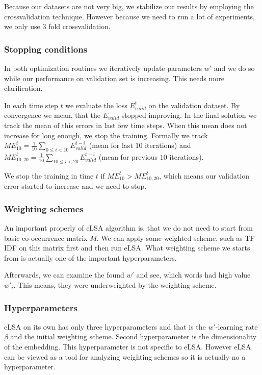     Because our datasets are not very big, we stabilize our results by employing the crossvalidation technique.  
    However because we need to run a lot of experiments, we only use $3$ fold crossvalidation.
    
    \subsubsection{Stopping conditions} \label{sec:elsa:stopping}
    
    In both optimization routines we iteratively update parameters $w'$ and we do so while our performance on validation set is increasing.
    This needs more clarification.
    
    In each time step $t$ we evaluate the loss $E_{valid}^t$ on the validation dataset.
    By convergence we mean, that the $E_{valid}$ stopped improving.
    In the final solution we track the mean of this errors in last few time steps.
    When this mean does not increase for long enough, we stop the training. 
    Formally we track 
    $ME_{10}^t = \frac{1}{10} \sum_{0\leq i < 10} E_{valid}^{t-i}$ (mean for last $10$ iterations) and
    $ME_{10,20}^t = \frac{1}{10} \sum_{10\leq i < 20} E_{valid}^{t-i}$ (mean for previous $10$ iterations).
    
    We stop the training in time $t$ if $ME_{10}^t > ME_{10,20}^t$, which means our validation error started to increase and we need to stop.
    
    \subsubsection{Weighting schemes}
    
    An important properly of eLSA algorithm is, that we do not need to start from basic co-occurrence matrix $M$. 
    We can apply some weighted scheme, such as TF-IDF on this matrix first and then run eLSA.
    What weighting scheme we starts from is actually one of the important hyperparameters.
    
    Afterwards, we can examine the found $w'$ and see, which words had high value $w'_i$.
    This means, they were underweighted by the weighting scheme.

    \subsubsection{Hyperparameters} \label{sec:hyperparams}
    
    eLSA on its own has only three hyperparameters and that is the $w'$-learning rate $\beta$ and the initial weighting scheme. 
    Second hyperparameter is the dimensionality of the embedding. 
    This hyperparameter is not specific to eLSA.
    However eLSA can be viewed as a tool for analyzing weighting schemes so it is actually no a hyperparameter.
    
